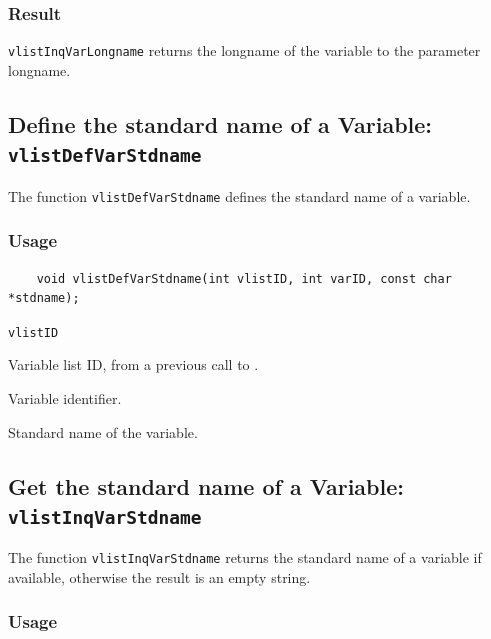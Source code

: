 \subsubsection*{Result}

{\texttt{vlistInqVarLongname}} returns the longname of the variable to the parameter longname.



\subsection{Define the standard name of a Variable: \texttt{vlistDefVarStdname}}
\label{vlistDefVarStdname}

The function {\texttt{vlistDefVarStdname}} defines the standard name of a variable.

\subsubsection*{Usage}

\begin{verbatim}
    void vlistDefVarStdname(int vlistID, int varID, const char *stdname);
\end{verbatim}

\hspace*{4mm}\begin{minipage}[]{15cm}
\begin{deflist}{\texttt{vlistID}\ }
\item[\texttt{vlistID}]
Variable list ID, from a previous call to {}.
\item[\texttt{varID}]
Variable identifier.
\item[\texttt{stdname}]
Standard name of the variable.

\end{deflist}
\end{minipage}


\subsection{Get the standard name of a Variable: \texttt{vlistInqVarStdname}}
\label{vlistInqVarStdname}

The function {\texttt{vlistInqVarStdname}} returns the standard name of a variable if available,
otherwise the result is an empty string.

\subsubsection*{Usage}

